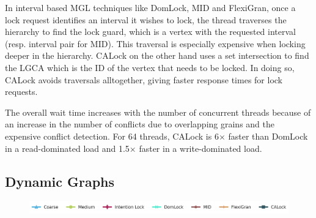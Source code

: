 In interval based MGL techniques like DomLock, MID and FlexiGran, once a lock request identifies an interval it wishes to lock, the thread traverses the hierarchy to find the lock guard, which is a vertex with the requested interval (resp. interval pair for MID). This traversal is especially expensive when locking deeper in the hierarchy. CALock on the other hand uses a set intersection to find the LGCA which is the ID of the vertex that needs to be locked. In doing so, CALock avoids traversals alltogether, giving faster response times for lock requests. 

The overall wait time increases with the number of concurrent threads because of an increase in the number of conflicts due to overlapping grains and the expensive conflict detection. For 64 threads, CALock is 6$\times$ faster than DomLock in a read-dominated load and 1.5$\times$ faster in a write-dominated load.







	



\subsection{Dynamic Graphs} \label{benchmark:DynamicOverallPerf}
\begin{figure}[ht]
	\centering
	\includegraphics[width=.9\textwidth]{figures/PerformanceCharts/Legend}
\end{figure}

